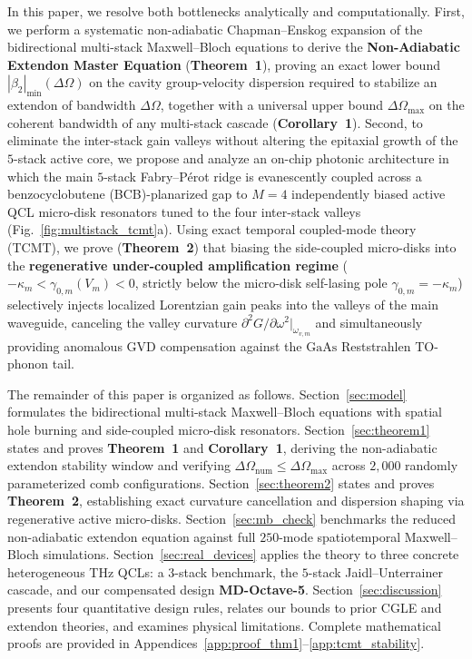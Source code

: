 \documentclass[11pt,letterpaper]{article}
\begin{document}
In this paper, we resolve both bottlenecks analytically and computationally. First, we perform a systematic non-adiabatic Chapman--Enskog expansion of the bidirectional multi-stack Maxwell--Bloch equations to derive the \textbf{Non-Adiabatic Extendon Master Equation} (\textbf{Theorem~1}), proving an exact lower bound $|\beta_2|_{\min}(\Delta\Omega)$ on the cavity group-velocity dispersion required to stabilize an extendon of bandwidth $\Delta\Omega$, together with a universal upper bound $\Delta\Omega_{\max}$ on the coherent bandwidth of any multi-stack cascade (\textbf{Corollary~1}). Second, to eliminate the inter-stack gain valleys without altering the epitaxial growth of the $5$-stack active core, we propose and analyze an on-chip photonic architecture in which the main $5$-stack Fabry--P\'erot ridge is evanescently coupled across a benzocyclobutene (BCB)-planarized gap to $M = 4$ independently biased active QCL micro-disk resonators tuned to the four inter-stack valleys (Fig.~\ref{fig:multistack_tcmt}a). Using exact temporal coupled-mode theory (TCMT), we prove (\textbf{Theorem~2}) that biasing the side-coupled micro-disks into the \textbf{regenerative under-coupled amplification regime} ($-\kappa_m < \gamma_{0,m}(V_m) < 0$, strictly below the micro-disk self-lasing pole $\gamma_{0,m} = -\kappa_m$) selectively injects localized Lorentzian gain peaks into the valleys of the main waveguide, canceling the valley curvature $\partial^2 G/\partial\omega^2|_{\omega_{v,m}}$ and simultaneously providing anomalous GVD compensation against the $\mathrm{GaAs}$ Reststrahlen TO-phonon tail.

The remainder of this paper is organized as follows. Section~\ref{sec:model} formulates the bidirectional multi-stack Maxwell--Bloch equations with spatial hole burning and side-coupled micro-disk resonators. Section~\ref{sec:theorem1} states and proves \textbf{Theorem~1} and \textbf{Corollary~1}, deriving the non-adiabatic extendon stability window and verifying $\Delta\Omega_{\mathrm{num}} \le \Delta\Omega_{\max}$ across $2{,}000$ randomly parameterized comb configurations. Section~\ref{sec:theorem2} states and proves \textbf{Theorem~2}, establishing exact curvature cancellation and dispersion shaping via regenerative active micro-disks. Section~\ref{sec:mb_check} benchmarks the reduced non-adiabatic extendon equation against full $250$-mode spatiotemporal Maxwell--Bloch simulations. Section~\ref{sec:real_devices} applies the theory to three concrete heterogeneous THz QCLs: a $3$-stack benchmark, the $5$-stack Jaidl--Unterrainer cascade, and our compensated design \textbf{MD-Octave-5}. Section~\ref{sec:discussion} presents four quantitative design rules, relates our bounds to prior CGLE and extendon theories, and examines physical limitations. Complete mathematical proofs are provided in Appendices~\ref{app:proof_thm1}--\ref{app:tcmt_stability}.
\end{document}
